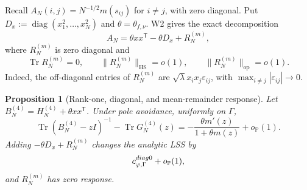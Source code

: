 \documentclass[10pt,a4paper]{amsart}
\newtheorem{proposition}[theorem]{Proposition}
\newcommand{\Tr}{\operatorname{Tr}}
\newcommand{\diag}{\operatorname{diag}}
\newcommand{\op}{\mathrm{op}}
\newcommand{\HS}{\mathrm{HS}}
\newcommand{\norm}[1]{\lVert #1\rVert}
\begin{document}
Recall \(A_N(i,j)=N^{-1/2}m(s_{ij})\) for \(i\ne j\), with zero diagonal.
Put \(D_x:=\diag(x_1^2,\ldots,x_N^2)\) and
\(\theta=\theta_{f,\nu}\).  W2 gives the exact decomposition
\begin{equation}\label{eq:R4-mean-decomp}
 A_N=\theta xx^{\mathsf T}-\theta D_x+R_N^{(m)},
\end{equation}
where \(R_N^{(m)}\) is zero diagonal and
\begin{equation}\label{eq:R4-mean-rem}
 \Tr R_N^{(m)}=0,\qquad
 \norm{R_N^{(m)}}_{\HS}=o(1),\qquad
 \norm{R_N^{(m)}}_{\op}=o(1).
\end{equation}
Indeed, the off-diagonal entries of \(R_N^{(m)}\) are
\(\sqrt\lambda x_ix_j\varepsilon_{ij}\), with
\(\max_{i\ne j}|\varepsilon_{ij}|\to0\).

\begin{proposition}[Rank-one, diagonal, and mean-remainder response]
\label{prop:R4-deterministic-response}
Let \(B_N^{(4)}=H_N^{(4)}+\theta xx^{\mathsf T}\).  Under pole avoidance,
uniformly on \(\Gamma\),
\begin{equation}\label{eq:R4-Woodbury-trace}
 \Tr(B_N^{(4)}-zI)^{-1}-\Tr G_N^{(4)}(z)
 =
 -\frac{\theta m'(z)}{1+\theta m(z)}
 +o_{\mathbb P}(1).
\end{equation}
Adding \(-\theta D_x+R_N^{(m)}\) changes the analytic LSS by
\begin{equation}\label{eq:R4-diag-response}
 c_{\varphi,\Gamma}^{\rm diag0}+o_{\mathbb P}(1),
\end{equation}
and \(R_N^{(m)}\) has zero response.
\end{proposition}
\end{document}
